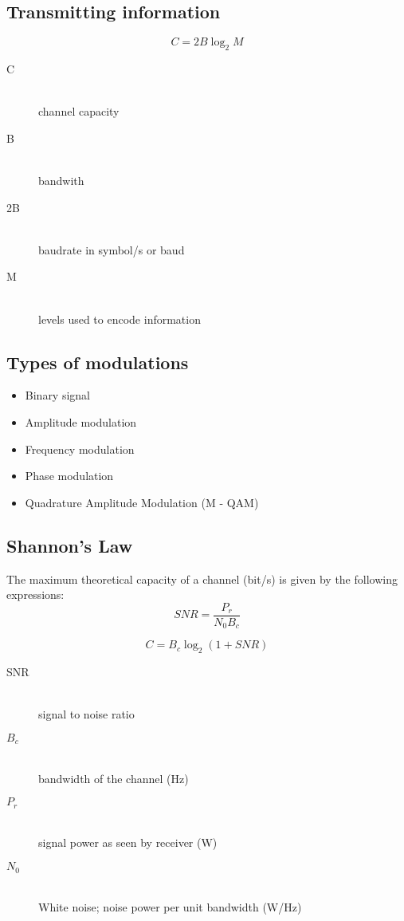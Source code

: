 \documentclass[../resumosRCOM.tex]{subfiles}
\begin{document}
 
\subsection{Transmitting information}

\begin{equation}
    C = 2B\log_2 M
\end{equation}

\begin{description}
    \item[C] \hfill \\ channel capacity
    \item[B] \hfill \\ bandwith
    \item[2B] \hfill \\ baudrate in symbol/s or baud
    \item[M] \hfill \\ levels used to encode information  
\end{description}

\subsection{Types of modulations}

\begin{itemize}
    \item Binary signal
    \item Amplitude modulation
    \item Frequency modulation
    \item Phase modulation
    \item Quadrature Amplitude Modulation (M - QAM)
\end{itemize}

\subsection{Shannon's Law}

The maximum theoretical capacity of a channel (bit/s) is given by the following expressions:
\begin{equation}
    SNR = \frac{P_r}{N_0B_c}
\end{equation}

\begin{equation}
    C = B_c\log_2 (1 + SNR)
\end{equation}

\begin{description}
    \item[SNR] \hfill \\ signal to noise ratio
    \item[\(B_c\)] \hfill \\ bandwidth of the channel (Hz)
    \item[\(P_r\)] \hfill \\  signal power as seen by receiver (W) 
    \item[\(N_0\)] \hfill \\  White noise; noise power per unit bandwidth (W/Hz)
\end{description}
\end{document}
